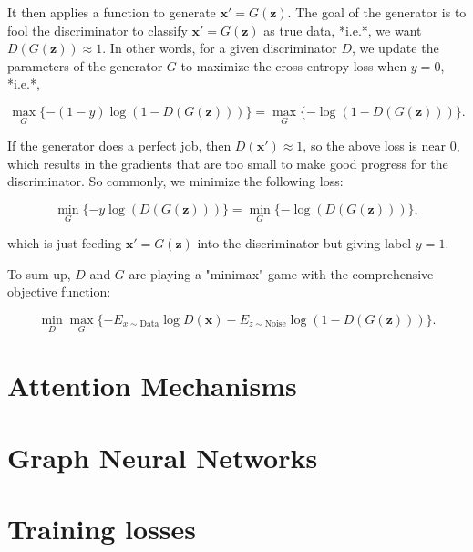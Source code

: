 It then applies a function to generate $\mathbf x'=G(\mathbf z)$. The goal of the generator is to fool the discriminator to classify $\mathbf x'=G(\mathbf z)$ as true data, *i.e.*, we want $D( G(\mathbf z)) \approx 1$.
In other words, for a given discriminator $D$, we update the parameters of the generator $G$ to maximize the cross-entropy loss when $y=0$, *i.e.*,

$$ \max_G \{ - (1-y) \log(1-D(G(\mathbf z))) \} = \max_G \{ - \log(1-D(G(\mathbf z))) \}.$$

If the generator does a perfect job, then $D(\mathbf x')\approx 1$, so the above loss is near 0, which results in the gradients that are too small to make good progress for the discriminator. So commonly, we minimize the following loss:

$$ \min_G \{ - y \log(D(G(\mathbf z))) \} = \min_G \{ - \log(D(G(\mathbf z))) \}, $$

which is just feeding $\mathbf x'=G(\mathbf z)$ into the discriminator but giving label $y=1$.


To sum up, $D$ and $G$ are playing a "minimax" game with the comprehensive objective function:

$$\min_D \max_G \{ -E_{x \sim \text{Data}} \log D(\mathbf x) - E_{z \sim \text{Noise}} \log(1 - D(G(\mathbf z))) \}.$$

\section{Attention Mechanisms}
\label{sec:3_attention}

\section{Graph Neural Networks}
\label{sec:3_gnns}

\section{Training losses}
\label{sec:3_losses}
